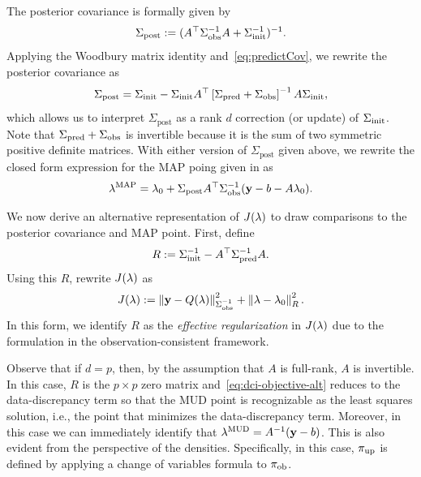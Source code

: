 The posterior covariance is formally given by
\begin{equation}\label{eq:map_cov}
\Sigma_\text{post} := ( A^\top {\Sigma}_\text{obs}^{-1} A + \Sigma_\text{init}^{-1} )^{-1}.
\end{equation}
Applying the Woodbury matrix identity and~\eqref{eq:predictCov}, we rewrite the posterior covariance as
\begin{equation}\label{eq:map_cov_analytical}
\Sigma_\text{post} = \Sigma_\text{init} - \Sigma_\text{init} A^\top \left[\Sigma_\text{pred} + \Sigma_\text{obs}\right]^{-1} A \Sigma_\text{init},
\end{equation}
which allows us to interpret $\Sigma_\text{post}$ as a rank $d$ correction (or update) of $\Sigma_\text{init}$.
Note that $\Sigma_\text{pred} + \Sigma_\text{obs}$ is invertible because it is the sum of two symmetric positive definite matrices.
With either version of $\Sigma_\text{post}$ given above, we rewrite the closed form expression for the MAP poing given in \cite{Tarantola_book} as
\begin{equation}\label{eq:map-point-analytical}
\lambda^{\text{MAP}} = \lambda_0 + \Sigma_\text{post} A^\top \Sigma_\text{obs}^{-1} (\mathbf{y} - b - A\lambda_0).
\end{equation}


We now derive an alternative representation of $J(\lambda)$ to draw comparisons to the posterior covariance and MAP point.
First, define
\begin{equation}\label{eq:eff_reg}
	R := \nolinebreak \initialCov^{-1} - \nolinebreak A^\top \predictedCov^{-1} A.
\end{equation}
Using this $R$, rewrite $J(\lambda)$ as
\begin{equation}\label{eq:dci-objective-alt}
J(\lambda):= \left\Vert\mathbf{y} - Q(\lambda)\right\Vert_{\Sigma_\text{obs}^{-1}}^2 + \left\Vert\lambda - \lambda_0\right\Vert_{R}^2.
\end{equation}
In this form, we identify $R$ as the {\em effective regularization} in $J(\lambda)$ due to the formulation in the observation-consistent framework.


Observe that if $d=p$, then, by the assumption that $A$ is full-rank, $A$ is invertible.
In this case, $R$ is the $p\times p$ zero matrix and~\eqref{eq:dci-objective-alt} reduces to the data-discrepancy term so that the MUD point is recognizable as the least squares solution, i.e., the point that minimizes the data-discrepancy term.
Moreover, in this case we can immediately identify that $\lambda^{\text{MUD}} = A^{-1}(\mathbf{y}-b)$.
This is also evident from the perspective of the densities.
Specifically, in this case, $\operatorname*{\pi_{up}}$ is defined by applying a change of variables formula to $\operatorname*{\pi_{ob}}$.

